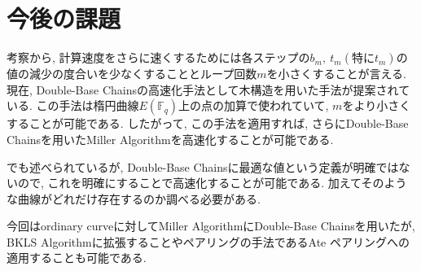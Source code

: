 \section{今後の課題}
考察から, 計算速度をさらに速くするためには各ステップの$b_m,\ t_m(特にt_m)$の値の減少の度合いを少なくすることとループ回数$m$を小さくすることが言える. 現在, Double-Base Chainsの高速化手法として木構造を用いた手法が提案されている. この手法は楕円曲線$E(\mathbb{F}_q)$上の点の加算で使われていて, $m$をより小さくすることが可能である. したがって, この手法を適用すれば, さらにDouble-Base Chainsを用いたMiller Algorithmを高速化することが可能である. 
\par
\cite{DBNS}でも述べられているが, Double-Base Chainsに最適な値という定義が明確ではないので, これを明確にすることで高速化することが可能である. 加えてそのような曲線がどれだけ存在するのか調べる必要がある. 
\par
今回はordinary curveに対してMiller AlgorithmにDouble-Base Chainsを用いたが, BKLS Algorithmに拡張することやペアリングの手法であるAte ペアリングへの適用することも可能である. 